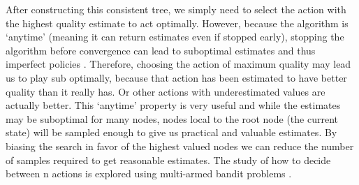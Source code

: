 \documentclass[msc, ai, twoside, notimes, logo, parskip, leftchapter, normalheadings]{infthesis}
\begin{document}
After constructing this consistent tree, we simply need to select the action with the highest quality estimate to act optimally. However, because the algorithm is `anytime' (meaning it can return estimates even if stopped early), stopping the algorithm before convergence can lead to suboptimal estimates and thus imperfect policies \citep{Gelly}. Therefore, choosing the action of maximum quality may lead us to play sub optimally, because that action has been estimated to have better quality than it really has. Or other actions with underestimated values are actually better. This `anytime' property is very useful and while the estimates may be suboptimal for many nodes, nodes local to the root node (the current state) will be sampled enough to give us practical and valuable estimates. By biasing the search in favor of the highest valued nodes we can reduce the number of samples required to get reasonable estimates. The study of how to decide between n actions is explored using multi-armed bandit problems \citep{Gelly}.
\end{document}
